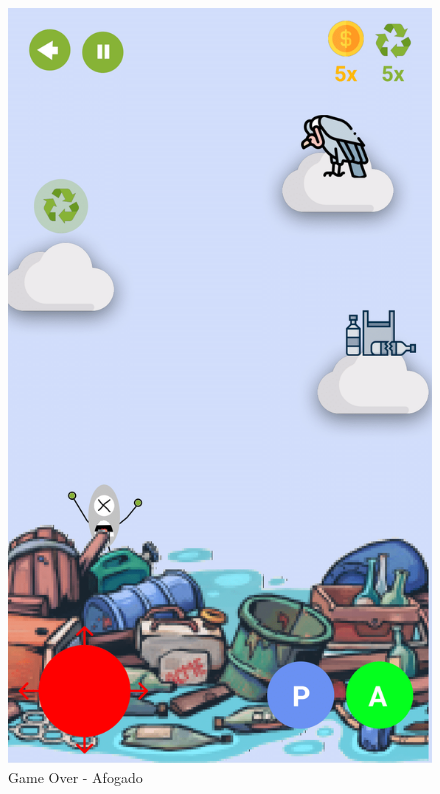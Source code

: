 \documentclass[]{scrartcl}
\begin{document}
\begin{figure}[H]
	\begin{center}
		\includegraphics[scale=0.3]{figs/Game Design-02.png}
		\caption{Game Over - Afogado}
	\end{center}
\end{figure}
\end{document}
